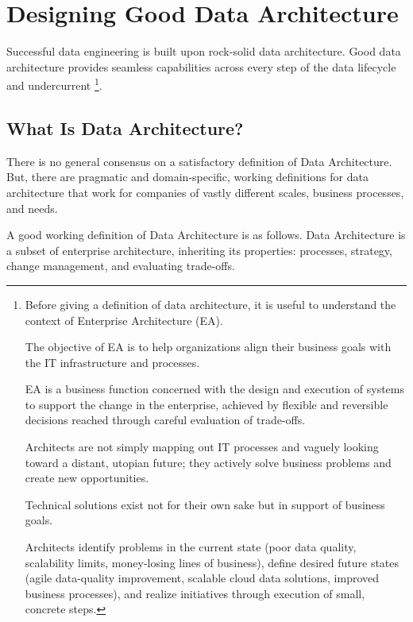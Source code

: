 \section{Designing Good Data Architecture}
Successful data engineering is built upon rock-solid data architecture.
Good data architecture provides seamless capabilities across every
step of the data lifecycle and undercurrent
\footnote{
    Before giving a definition of data architecture,
    it is useful to understand the context of Enterprise Architecture
    (EA).

    The objective of EA is to help organizations align their business
    goals with the IT infrastructure and processes.

    EA is a business function concerned with the design and execution
    of systems to support the change in the enterprise, achieved
    by flexible and reversible decisions reached through careful
    evaluation of trade-offs.

    Architects are not simply mapping out IT processes and vaguely
    looking toward a distant, utopian future; they actively solve
    business problems and create new opportunities.

    Technical solutions exist not for their own sake but in support
    of business goals.
    
    Architects identify problems in the current state (poor data
    quality, scalability limits, money-losing lines of business),
    define desired future states (agile data-quality improvement,
    scalable cloud data solutions, improved business processes),
    and realize initiatives through execution of small, concrete steps.
}.





\subsection{What Is Data Architecture?}
There is no general consensus on a satisfactory definition of 
Data Architecture. But, there are pragmatic and domain-specific,
working definitions for data architecture that work for companies of
vastly different scales, business processes, and needs.

A good working definition of Data Architecture is as follows.
Data Architecture is a subset of enterprise architecture, inheriting
its properties: processes, strategy, change management, and evaluating
trade-offs.

